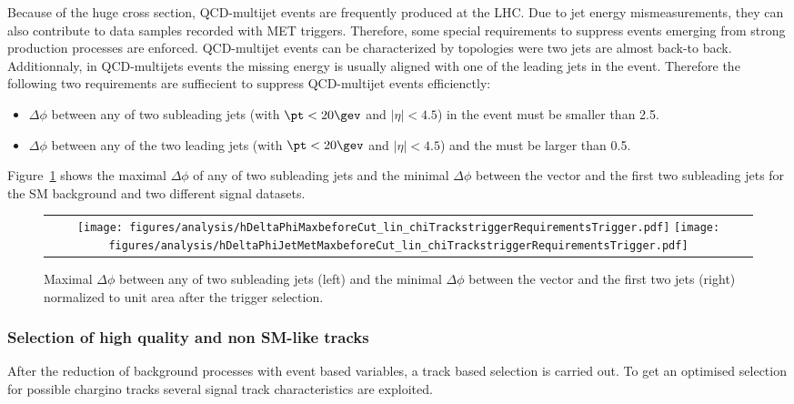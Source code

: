 Because of the huge cross section, QCD-multijet events are frequently produced at the LHC.
Due to jet energy mismeasurements, they can also contribute to data samples recorded with MET triggers.
Therefore, some special requirements to suppress events emerging from strong production processes are enforced.
QCD-multijet events can be characterized by topologies were two jets are almost back-to back.
Additionnaly, in QCD-multijets events the missing energy is usually aligned with one of the leading jets in the event.
Therefore the following two requirements are suffiecient to suppress QCD-multijet events efficienctly:
\begin{itemize}
\renewcommand{\labelitemi}{\footnotesize{\ding{118}}}
\item $\Delta\phi$ between any of two subleading jets (with $\pt<20\gev$ and $|\eta|<4.5$) in the event must be smaller than 2.5. %
\item $\Delta\phi$ between any of the two leading jets (with $\pt<20\gev$ and $|\eta|<4.5$) and the \met must be larger than 0.5. %
\end{itemize}
Figure~\ref{fig:QCDcuts} shows the maximal $\Delta\phi$ of any of two subleading jets and the minimal $\Delta\phi$ between the \met vector and the first two subleading jets for the SM background and two different signal datasets.
\begin{figure}[!t]
  \centering 
  \begin{tabular}{c}
    \texttt{[image: figures/analysis/hDeltaPhiMaxbeforeCut\_lin\_chiTrackstriggerRequirementsTrigger.pdf]}
    \texttt{[image: figures/analysis/hDeltaPhiJetMetMaxbeforeCut\_lin\_chiTrackstriggerRequirementsTrigger.pdf]}
  \end{tabular}
  \caption{Maximal $\Delta \phi$ between any of two subleading jets (left) and the minimal $\Delta \phi$  between the \met vector and the first two jets (right) normalized to unit area after the trigger selection.}
  \label{fig:QCDcuts}
\end{figure}
\hspace{0.9cm}

\subsubsection*{Selection of high quality and non SM-like tracks}
After the reduction of background processes with event based variables, a track based selection is carried out.
To get an optimised selection for possible chargino tracks several signal track characteristics are exploited.

